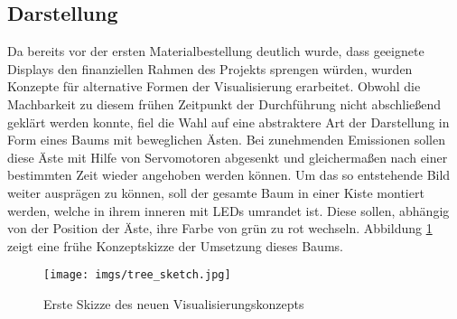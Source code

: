 \documentclass[.../Dokumentation.tex]{subfiles}
\begin{document}
\subsection{Darstellung}\label{sec-ita1-visualization}
Da bereits vor der ersten Materialbestellung deutlich wurde, 
dass geeignete Displays den finanziellen Rahmen des Projekts sprengen 
würden, wurden Konzepte für alternative Formen der Visualisierung erarbeitet.
Obwohl die Machbarkeit zu diesem frühen Zeitpunkt der Durchführung nicht 
abschließend geklärt werden konnte, fiel die Wahl auf eine abstraktere Art 
der Darstellung in Form eines Baums mit beweglichen Ästen.
Bei zunehmenden Emissionen sollen diese Äste mit Hilfe von 
Servomotoren abgesenkt und gleichermaßen nach einer bestimmten Zeit wieder 
angehoben werden können. Um das so entstehende Bild weiter ausprägen zu können, 
soll der gesamte Baum in einer Kiste montiert werden, welche in ihrem inneren 
mit LEDs umrandet ist. Diese sollen, abhängig von der Position der Äste, 
ihre Farbe von grün zu rot wechseln.
Abbildung \ref{fig-tree-sketch} zeigt eine frühe Konzeptskizze der Umsetzung 
dieses Baums.
\begin{figure}[H]
    \begin{center}
    \texttt{[image: imgs/tree\_sketch.jpg]}
    \caption{Erste Skizze des neuen Visualisierungskonzepts}
    \label{fig-tree-sketch}
    \end{center}
\end{figure}
\end{document}
